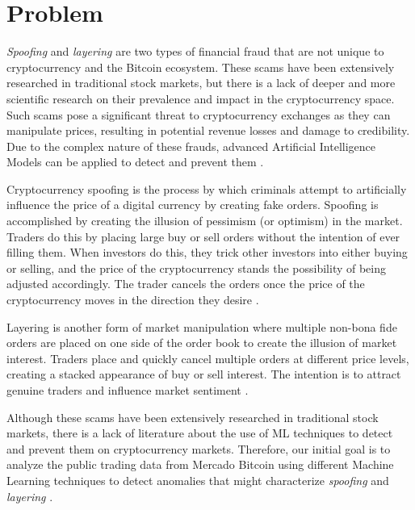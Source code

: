 \section{Problem}
\textit{Spoofing} and \textit{layering} are two types of financial fraud that are not unique to cryptocurrency and the
Bitcoin ecosystem. These scams have been extensively researched in traditional stock markets, but there is a lack of
deeper and more scientific research on their prevalence and impact in the cryptocurrency space. Such scams pose a
significant threat to cryptocurrency exchanges as they can manipulate prices, resulting in potential revenue losses and
damage to credibility. Due to the complex nature of these frauds, advanced Artificial Intelligence Models can be applied
to detect and prevent them \cite{zhang2020financial, zainal2018review}.

Cryptocurrency spoofing is the process by which criminals attempt to artificially influence the price of a digital
currency by creating fake orders. Spoofing is accomplished by creating the illusion of pessimism (or optimism) in the
market. Traders do this by placing large buy or sell orders without the intention of ever filling them. When investors
do this, they trick other investors into either buying or selling, and the price of the cryptocurrency stands the
possibility of being adjusted accordingly. The trader cancels the orders once the price of the cryptocurrency moves in
the direction they desire \cite{hasbrouck2013spoofing}.

Layering is another form of market manipulation where multiple non-bona fide orders are placed on one side of the order
book to create the illusion of market interest. Traders place and quickly cancel multiple orders at different price
levels, creating a stacked appearance of buy or sell interest. The intention is to attract genuine traders and influence
market sentiment \cite{brogaard2014market}.

Although these scams have been extensively researched in traditional stock markets, there is a lack of literature about
the use of ML techniques to detect and prevent them on cryptocurrency markets. Therefore, our initial goal is to analyze
the public trading data from Mercado Bitcoin using different Machine Learning techniques to detect anomalies that might
characterize \textit{spoofing} and \textit{layering} \cite{bhattacharyya2011survey}.